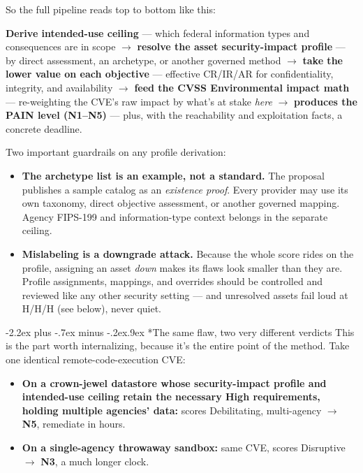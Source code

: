 \documentclass[11pt]{article}
\makeatletter
\renewcommand\section{\@startsection{section}{1}{\z@}%
  {-2.2ex plus -.7ex minus -.2ex}{.9ex}%
  {\normalfont\Large\bfseries}}
\makeatother
\begin{document}
So the full pipeline reads top to bottom like this:

\begin{plain}
\textbf{Derive intended-use ceiling} --- which federal information types and
consequences are in scope $\rightarrow$ \textbf{resolve the asset security-impact
profile} --- by direct assessment, an archetype, or another governed method
$\rightarrow$ \textbf{take the lower value
on each objective} --- effective CR/IR/AR for confidentiality, integrity, and
availability $\rightarrow$ \textbf{feed the CVSS
Environmental impact math} --- re-weighting the CVE's raw impact by what's at stake
\emph{here} $\rightarrow$ \textbf{produces the PAIN level (N1--N5)} --- plus, with
the reachability and exploitation facts, a concrete deadline.
\end{plain}

Two important guardrails on any profile derivation:
\begin{itemize}[leftmargin=1.5em]
\item \textbf{The archetype list is an example, not a standard.} The proposal
  publishes a sample catalog as an \emph{existence proof}. Every provider may use
  its own taxonomy, direct objective assessment, or another governed mapping.
  Agency FIPS-199 and information-type context belongs in the separate ceiling.
\item \textbf{Mislabeling is a downgrade attack.} Because the whole score rides on
  the profile, assigning an asset \emph{down} makes its flaws look smaller than
  they are. Profile assignments, mappings, and overrides should be controlled and
  reviewed like any other security setting --- and unresolved assets fail loud at
  H/H/H (see below), never quiet.
\end{itemize}

\section*{The same flaw, two very different verdicts}
This is the part worth internalizing, because it's the entire point of the method.
Take one identical remote-code-execution CVE:
\begin{itemize}[leftmargin=1.5em]
\item \textbf{On a crown-jewel datastore whose security-impact profile and
  intended-use ceiling retain the necessary High requirements, holding multiple
  agencies' data:} scores
  Debilitating, multi-agency $\rightarrow$ \textbf{N5}, remediate in hours.
\item \textbf{On a single-agency throwaway sandbox:} same CVE, scores Disruptive
  $\rightarrow$ \textbf{N3}, a much longer clock.
\end{itemize}
\end{document}
